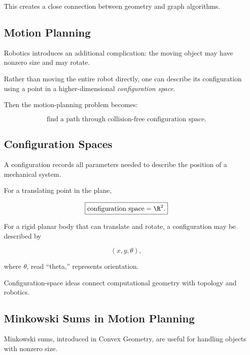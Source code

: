 This creates a close connection between geometry and graph algorithms.

\subsection{Motion Planning}
\label{subsec:motion-planning}

Robotics introduces an additional complication: the moving object may have
nonzero size and may rotate.

Rather than moving the entire robot directly, one can describe its
configuration using a point in a higher-dimensional
\emph{configuration space}.

Then the motion-planning problem becomes:

\[
\boxed{
\text{find a path through collision-free configuration space}.
}
\]

\subsection{Configuration Spaces}
\label{subsec:configuration-spaces}

A configuration records all parameters needed to describe the position of a
mechanical system.

For a translating point in the plane,

\[
\boxed{
\text{configuration space}=\R^2.
}
\]

For a rigid planar body that can translate and rotate, a configuration may
be described by

\[
\boxed{
(x,y,\theta),
}
\]

where \(\theta\), read ``theta,'' represents orientation.

Configuration-space ideas connect computational geometry with topology and
robotics.

\subsection{Minkowski Sums in Motion Planning}
\label{subsec:minkowski-motion-planning}

Minkowski sums, introduced in Convex Geometry, are useful for handling
objects with nonzero size.

